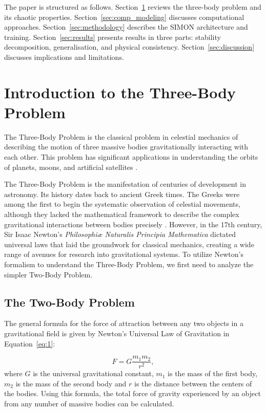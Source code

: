 \documentclass[12pt]{article}
\begin{document}
The paper is structured as follows. Section~\ref{sec:lit_review} reviews the three-body
problem and its chaotic properties. Section~\ref{sec:comp_modeling} discusses computational
approaches. Section~\ref{sec:methodology} describes the SIMON architecture and training.
Section~\ref{sec:results} presents results in three parts: stability decomposition,
generalisation, and physical consistency. Section~\ref{sec:discussion} discusses implications
and limitations.

\section{Introduction to the Three-Body Problem}
\label{sec:lit_review}

The Three-Body Problem is the classical problem in celestial mechanics of describing the motion of three massive bodies gravitationally interacting with each other. This problem has significant applications in understanding the orbits of planets, moons, and artificial satellites \citep{gardner2006james}.

The Three-Body Problem is the manifestation of centuries of development in astronomy. Its history dates back to ancient Greek times. The Greeks were among the first to begin the systematic observation of celestial movements, although they lacked the mathematical framework to describe the complex gravitational interactions between bodies precisely \citep{anjum2020timelinegravity}. However, in the 17th century, Sir Isaac Newton's \textit{Philosophi\ae{} Naturalis Principia Mathematica} \citep{newton1687principia, cohen1999principia} dictated universal laws that laid the groundwork for classical mechanics, creating a wide range of avenues for research into gravitational systems. To utilize Newton's formalism to understand the Three-Body Problem, we first need to analyze the simpler Two-Body Problem.

\subsection{The Two-Body Problem}
\label{subsec:2bp}
The general formula for the force of attraction between any two objects in a gravitational field is given by Newton's Universal Law of Gravitation in Equation~\ref{eq:1}:

\begin{equation}
    F=G\frac{m_1m_2}{r^2},
    \label{eq:1}
\end{equation}
where $G$ is the universal gravitational constant, $m_1$ is the mass of the first body, $m_2$ is the mass of the second body and $r$ is the distance between the centers of the bodies. Using this formula, the total force of gravity experienced by an object from any number of massive bodies can be calculated.
\end{document}
